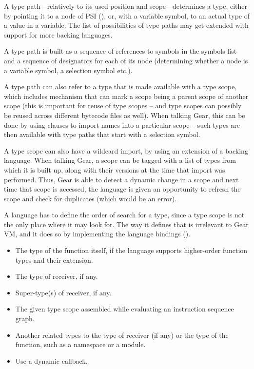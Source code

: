 A type path---relatively to its used position and scope---determines a type, either by pointing it to a node of PSI (), or, with a variable symbol, to an actual type of a value in a variable. The list of possibilities of type paths may get extended with support for more backing languages. 

A type path is built as a sequence of references to symbols in the symbols list and a sequence of designators for each of its node (determining whether a node is a variable symbol, a selection symbol etc.).

A type path can also refer to a type that is made available with a type scope, which includes mechanism that can mark a scope being a parent scope of another scope (this is important for reuse of type scopes -- and type scopes can possibly be reused across different bytecode files as well). When talking Gear, this can be done by using  clauses to import names into a particular scope -- such types are then available with type paths that start with a selection symbol. 

A type scope can also have a wildcard import, by using an extension of a backing language. When talking Gear, a scope can be tagged with a list of types from which it is built up, along with their versions at the time that import was performed. Thus, Gear is able to detect a dynamic change in a scope and next time that scope is accessed, the language is given an opportunity to refresh the scope and check for duplicates (which would be an error). 

A language has to define the order of search for a type, since a type scope is not the only place where it may look for. The way it defines that is irrelevant to Gear VM, and it does so by implementing the language bindings (). 

\begin{itemize}
\item The type of the function itself, if the language supports higher-order function types and their extension. 
\item The type of receiver, if any. 
\item Super-type(s) of receiver, if any. 
\item The given type scope assembled while evaluating an instruction sequence graph. 
\item Another related types to the type of receiver (if any) or the type of the function, such as a namespace or a module. 
\item Use a dynamic callback. 
\end{itemize}


